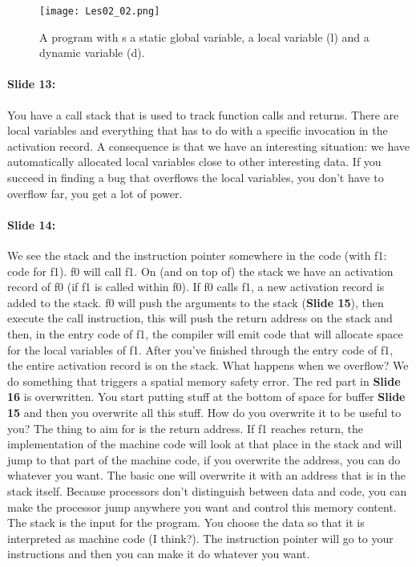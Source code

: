 \documentclass[10pt,a4paper]{report}
\begin{document}
\begin{figure}[ht!]
\centering
\texttt{[image: Les02\_02.png]}
\caption{A program with s a static global variable, a local variable (l) and a dynamic variable (d).} 
\label{les02_02}
\end{figure}

\paragraph{Slide 13:} You have a call stack that is used to track function calls and returns. There are local variables and everything that has to do with a specific invocation in the activation record. A consequence is that we have an interesting situation: we have automatically allocated local variables close to other interesting data. If you succeed in finding a bug that overflows the local variables, you don't have to overflow far, you get a lot of power.

\paragraph{Slide 14:} We see the stack and the instruction pointer somewhere in the code (with f1: code for f1). f0 will call f1. On (and on top of) the stack we have an activation record of f0 (if f1 is called within f0). If f0 calls f1, a new activation record is added to the stack. f0 will push the arguments to the stack (\textbf{Slide 15}), then execute the call instruction, this will push the return address on the stack and then, in the entry code of f1, the compiler will emit code that will allocate space for the local variables of f1. After you've finished through the entry code of f1, the entire activation record is on the stack. 
What happens when we overflow? We do something that triggers a spatial memory safety error. The red part in \textbf{Slide 16} is overwritten. You start putting stuff at the bottom of space for buffer \textbf{Slide 15} and then you overwrite all this stuff. How do you overwrite it to be useful to you? The thing to aim for is the return address. If f1 reaches return, the implementation of the machine code will look at that place in the stack and will jump to that part of the machine code, if you overwrite the address, you can do whatever you want. The basic one will overwrite it with an address that is in the stack itself. Because processors don't distinguish between data and code, you can make the processor jump anywhere you want and control this memory content. The stack is the input for the program. You choose the data so that it is interpreted as machine code (I think?). The instruction pointer will go to your instructions and then you can make it do whatever you want.
\end{document}
